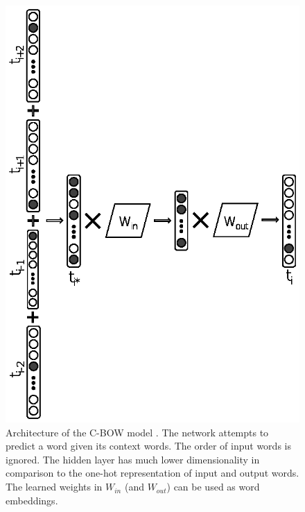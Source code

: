
\begin{figure}[t]
\begin{center}
    \includegraphics[scale=0.99]{Figures/CBOW_diagram.eps}
	\caption{Architecture of the C-BOW model \parencite{mitra2018introduction}. The network attempts to predict a word given its context words. The order of input words is ignored. The hidden layer has much lower dimensionality in comparison to the one-hot representation of input and output words. The learned weights in $W_{in}$ (and $W_{out}$) can be used as word embeddings.}\label{chap:word_embeddingss:fig:CBOW_diagram}
\end{center}
\end{figure}

